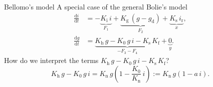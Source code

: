 \documentclass{beamer}
\providecommand{\m}[1]{\ensuremath{\mathrm{#1}}}
\begin{document}
\begin{frame}{Bellomo's model}
A special case of the general Bolie's model
\begin{align*}
 \frac{\m{d}i}{\m{d}t} &= -\underbrace{K_{\mathrm{i}}\,i}_{F_1} + \underbrace{K_{\mathrm{g}}\,(g - g_{\mathrm{d}})}_{F_2} + \underbrace{K_{\mathrm{s}}\,i_{\mathrm{r}}}_{x}, \\
 \frac{\m{d}g}{\m{d}t} &= \underbrace{K_{\mathrm{h}}\,g - K_0\,g\,i - K_{\mathrm{s}}\,K_{\mathrm{f}}}_{-F_3-F_4} + \underbrace{0}_{y}.
\end{align*}
How do we interpret the terms $K_{\mathrm{h}}\,g - K_0\,g\,i - K_{\mathrm{s}}\,K_{\mathrm{f}}$?
\[ K_{\mathrm{h}}\,g - K_0\,g\,i = K_{\mathrm{n}}\,g\left(1 - \frac{K_0}{K_{\mathrm{n}}}\,i\right) := K_{\mathrm{n}}\,g(1 - a\,i). \]



\end{frame}

\begin{frame}{ }

\end{frame}
\end{document}
